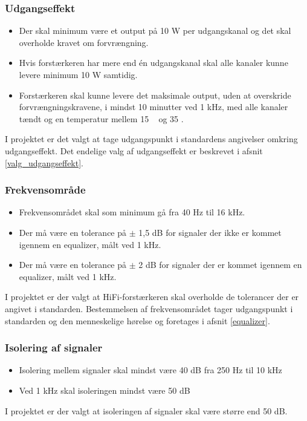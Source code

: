 \subsubsection*{Udgangseffekt}
\begin{itemize}
\item Der skal minimum være et output på 10 W per udgangskanal og det skal overholde kravet om forvrængning.
\item Hvis forstærkeren har mere end én udgangskanal skal alle kanaler kunne levere minimum 10 W samtidig.
\item Forstærkeren skal kunne levere det maksimale output, uden at overskride forvrængningskravene, i mindst 10 minutter ved 1 kHz, med alle kanaler tændt og en temperatur mellem 15 \celsius~ og 35 \celsius.
\end{itemize}
I projektet er det valgt at tage udgangspunkt i standardens angivelser omkring udgangseffekt. Det endelige valg af udgangseffekt er beskrevet i afsnit \ref{valg_udgangseffekt}.

\subsubsection*{Frekvensområde}
\begin{itemize}
\item Frekvensområdet skal som minimum gå fra 40 Hz til 16 kHz.
\item Der må være en tolerance på $\pm$ 1,5 dB for signaler der ikke er kommet igennem en equalizer, målt ved 1 kHz.
\item Der må være en tolerance på $\pm$ 2 dB for signaler der er kommet igennem en equalizer, målt ved 1 kHz.
\end{itemize}
I projektet er der valgt at HiFi-forstærkeren skal overholde de tolerancer der er angivet i standarden. Bestemmelsen af frekvensområdet tager udgangspunkt i standarden og den menneskelige hørelse og foretages i afsnit \ref{equalizer}.

\subsubsection*{Isolering af signaler}
\begin{itemize}
\item Isolering mellem signaler skal mindst være 40 dB fra 250 Hz til 10 kHz
\item Ved 1 kHz skal isoleringen mindst være 50 dB
\end{itemize}
I projektet er der valgt at isoleringen af signaler skal være større end 50 dB.

